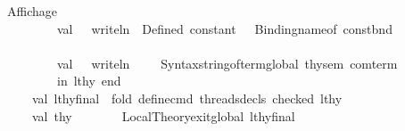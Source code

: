 \begin{isabellebody}
\isanewline
\ \ \ \ \ \ {\isacharparenleft}{\kern0pt}{\isacharasterisk}{\kern0pt}Affichage{\isacharasterisk}{\kern0pt}{\isacharparenright}{\kern0pt}\isanewline
\ \ \ \ \ \ \ \ \ \ \ \ \ \ val\ {\isacharunderscore}{\kern0pt}\ {\isacharequal}{\kern0pt}\ writeln\ {\isacharparenleft}{\kern0pt}{\isachardoublequote}{\kern0pt}{\isasymcheckmark}\ Defined\ constant{\isacharcolon}{\kern0pt}\ {\isachardoublequote}{\kern0pt}\ {\isacharcircum}{\kern0pt}\ Binding{\isachardot}{\kern0pt}name{\isacharunderscore}{\kern0pt}of\ const{\isacharunderscore}{\kern0pt}bnd{\isacharparenright}{\kern0pt}\isanewline
\ \ \ \ \ \ \ \ \ \ \ \ \isanewline
\ \ \ \ \ \ \ \ \ \ \ \ \ \ val\ {\isacharunderscore}{\kern0pt}\ {\isacharequal}{\kern0pt}\ writeln\ {\isacharparenleft}{\kern0pt}{\isachardoublequote}{\kern0pt}\ \ {\isachardoublequote}{\kern0pt}\ {\isacharcircum}{\kern0pt}\ Syntax{\isachardot}{\kern0pt}string{\isacharunderscore}{\kern0pt}of{\isacharunderscore}{\kern0pt}term{\isacharunderscore}{\kern0pt}global\ thy{\isacharunderscore}{\kern0pt}sem\ com{\isacharunderscore}{\kern0pt}term{\isacharparenright}{\kern0pt}\isanewline
\isanewline
\ \ \ \ \ \ \ \ \ \ \ \ \ \ in\ lthy{\isacharprime}{\kern0pt}\ end\isanewline
\isanewline
\ \ \ \ \ \ \ \ \ \ val\ lthy{\isacharunderscore}{\kern0pt}final\ {\isacharequal}{\kern0pt}\ fold\ define{\isacharunderscore}{\kern0pt}cmd\ {\isacharparenleft}{\kern0pt}{\isacharhash}{\kern0pt}threads{\isacharunderscore}{\kern0pt}decls\ checked{\isacharparenright}{\kern0pt}\ lthy{}\isanewline
\ \ \ \ \ \ \ \ \ \ val\ thy{\isacharprime}{\kern0pt}\ \ \ \ \ \ \ {\isacharequal}{\kern0pt}\ Local{\isacharunderscore}{\kern0pt}Theory{\isachardot}{\kern0pt}exit{\isacharunderscore}{\kern0pt}global\ lthy{\isacharunderscore}{\kern0pt}final\isanewline
\isanewline
\ \ \ \ \ \ \ \ \ \ \ \ \isanewline

\end{isabellebody}
